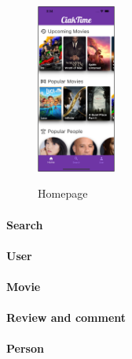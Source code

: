 \documentclass[12pt, a4paper]{article}
\numberwithin{figure}{section}
\begin{document}
\begin{center}
	\begin{figure}[H]
		\centering
		\includegraphics[width=0.23\textwidth]{images/prototype2/home.png}\\
		\caption{Homepage}
	\end{figure}	
\end{center}


\paragraph{Search}

\paragraph{User}

\paragraph{Movie}

\paragraph{Review and comment}

\paragraph{Person}
\end{document}
